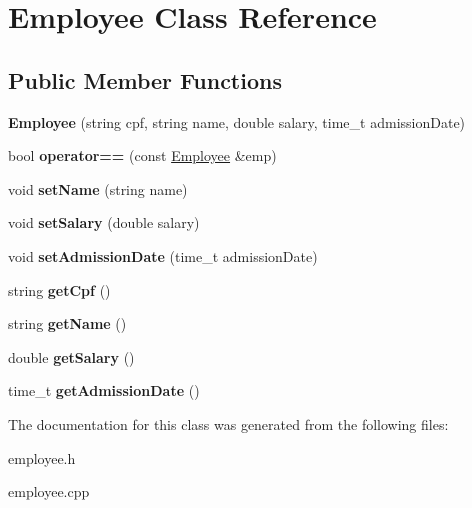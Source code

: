 \hypertarget{classEmployee}{}\section{Employee Class Reference}
\label{classEmployee}
\subsection*{Public Member Functions}
\begin{DoxyCompactItemize}
\item 
{\bfseries Employee} (string cpf, string name, double salary, time\+\_\+t admission\+Date)\hypertarget{classEmployee_a2514c44af4f3b3d508a1b32e6201bdc8}{}\label{classEmployee_a2514c44af4f3b3d508a1b32e6201bdc8}

\item 
bool {\bfseries operator==} (const \hyperlink{classEmployee}{Employee} \&emp)\hypertarget{classEmployee_a0d4ccc61746e6b22b81bbbc95e88e91c}{}\label{classEmployee_a0d4ccc61746e6b22b81bbbc95e88e91c}

\item 
void {\bfseries set\+Name} (string name)\hypertarget{classEmployee_a48413d9e42c136dabcbf8a985516af53}{}\label{classEmployee_a48413d9e42c136dabcbf8a985516af53}

\item 
void {\bfseries set\+Salary} (double salary)\hypertarget{classEmployee_a1874b9c4d606ff5fe224d8446fc8c3f8}{}\label{classEmployee_a1874b9c4d606ff5fe224d8446fc8c3f8}

\item 
void {\bfseries set\+Admission\+Date} (time\+\_\+t admission\+Date)\hypertarget{classEmployee_a07fb8d782595a8fe869f12235d08f463}{}\label{classEmployee_a07fb8d782595a8fe869f12235d08f463}

\item 
string {\bfseries get\+Cpf} ()\hypertarget{classEmployee_a72828d05f23f2e09528a1a04e9915c52}{}\label{classEmployee_a72828d05f23f2e09528a1a04e9915c52}

\item 
string {\bfseries get\+Name} ()\hypertarget{classEmployee_ab2476ea9935bcc3417c41e48c4f1b297}{}\label{classEmployee_ab2476ea9935bcc3417c41e48c4f1b297}

\item 
double {\bfseries get\+Salary} ()\hypertarget{classEmployee_a90bba58cb74e7956cc133e93b4d74cb8}{}\label{classEmployee_a90bba58cb74e7956cc133e93b4d74cb8}

\item 
time\+\_\+t {\bfseries get\+Admission\+Date} ()\hypertarget{classEmployee_a4f790386fed101fb8ac4ba2f3036bea2}{}\label{classEmployee_a4f790386fed101fb8ac4ba2f3036bea2}

\end{DoxyCompactItemize}


The documentation for this class was generated from the following files\+:\begin{DoxyCompactItemize}
\item 
employee.\+h\item 
employee.\+cpp\end{DoxyCompactItemize}
